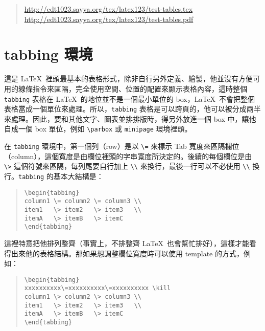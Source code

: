 \begin{quote}
  \url{http://edt1023.sayya.org/tex/latex123/test-tables.tex}\\
  \url{http://edt1023.sayya.org/tex/latex123/test-tables.pdf}
\end{quote}

\section{tabbing 環境}
\label{sec:tabbing}

這是 \LaTeX\ 裡頭最基本的表格形式，除非自行另外定義、繪製，他並沒有方便可用的線條指令來區隔，完全使用空間、位置的配置來顯示表格內容，這時整個 \texttt{tabbing} 表格在 \LaTeX\ 的地位並不是一個最小單位的 box，\LaTeX\ 不會把整個表格當成一個單位來處理。所以，\texttt{tabbing} 表格是可以跨頁的，他可以被分成兩半來處理。因此，要和其他文字、圖表並排排版時，得另外放進一個 box 中，讓他自成一個 box 單位，例如 \verb|\parbox| 或 \texttt{minipage} 環境裡頭。

在 \texttt{tabbing} 環境中，第一個列（row）是以 \verb|\=| 來標示 \textsf{Tab} 寬度來區隔欄位（column），這個寬度是由欄位裡頭的字串寬度所決定的。後續的每個欄位是由 \verb|\>| 這個符號來區隔，每列尾要自行加上 \verb|\\|\index{\\@\verb=\\=} 來換行，最後一行可以不必使用 \verb|\\| 換行。\texttt{tabbing} 的基本大結構是：

\begin{quote}
  \begin{verbatim}
\begin{tabbing}
column1 \= column2 \= column3 \\
item1   \> item2   \> item3   \\
itemA   \> itemB   \> itemC
\end{tabbing}
\end{verbatim}
\end{quote}

這裡特意把他排列整齊（事實上，不排整齊 \LaTeX\ 也會幫忙排好），這樣才能看得出來他的表格結構。那如果想調整欄位寬度時可以使用 template 的方式，例如：

\begin{quote}
  \begin{verbatim}
\begin{tabbing}
xxxxxxxxxx\=xxxxxxxxxx\=xxxxxxxxxx \kill
column1 \> column2 \> column3 \\
item1   \> item2   \> item3   \\
itemA   \> itemB   \> itemC
\end{tabbing}
\end{verbatim}
\end{quote}

